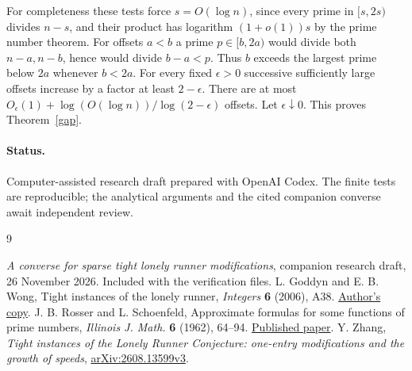\documentclass[11pt,a4paper]{article}
\begin{document}
For completeness these tests force $s=O(\log n)$, since every prime in $[s,2s)$ divides $n-s$, and their product has logarithm $(1+o(1))s$ by the prime number theorem. For offsets $a<b$ a prime $p\in[b,2a)$ would divide both $n-a,n-b$, hence would divide $b-a<p$. Thus $b$ exceeds the largest prime below $2a$ whenever $b<2a$. For every fixed $\epsilon>0$ successive sufficiently large offsets increase by a factor at least $2-\epsilon$. There are at most $O_\epsilon(1)+\log(O(\log n))/\log(2-\epsilon)$ offsets. Let $\epsilon\downarrow0$. This proves Theorem~\ref{gap}.


\paragraph{Status.} Computer-assisted research draft prepared with OpenAI Codex. The finite tests are reproducible; the analytical arguments and the cited companion converse await independent review.
\begin{thebibliography}{9}\small\raggedright
{} \emph{A converse for sparse tight lonely runner modifications}, companion research draft, 26 November 2026. Included with the verification files.
 L. Goddyn and E. B. Wong, Tight instances of the lonely runner, \emph{Integers} \textbf{6} (2006), A38. \href{https://www.sfu.ca/~goddyn/Papers/063tight_lonely_runner.pdf}{Author's copy}.
 J. B. Rosser and L. Schoenfeld, Approximate formulas for some functions of prime numbers, \emph{Illinois J. Math.} \textbf{6} (1962), 64--94. \href{https://doi.org/10.1215/ijm/1255631807}{Published paper}.
 Y. Zhang, \emph{Tight instances of the Lonely Runner Conjecture: one-entry modifications and the growth of speeds}, \href{https://arxiv.org/html/2608.13599v3}{arXiv:2608.13599v3}.
\end{thebibliography}
\end{document}
